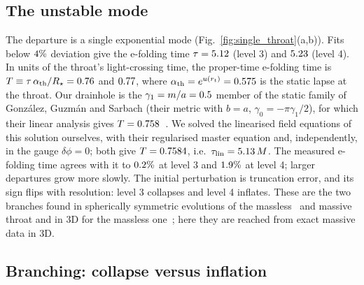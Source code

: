 \documentclass[twocolumn,floatfix,aps,prd,superscriptaddress,nofootinbib,showkeys]{revtex4-2}
\begin{document}
\subsection{The unstable mode}
\label{sec:single:instability}

The departure is a single exponential mode (Fig.~\ref{fig:single_throat}(a,b)). Fits below $4\%$ deviation give the e-folding time $\tau=5.12$ (level 3) and $5.23$ (level 4). In units of the throat's light-crossing time, the proper-time e-folding time is $T\equiv\tau\,\alpha_{\rm th}/R_\star=0.76$ and $0.77$, where $\alpha_{\rm th}=e^{u(r_t)}=0.575$ is the static lapse at the throat. Our drainhole is the $\gamma_1=m/a=0.5$ member of the static family of Gonz\'alez, Guzm\'an and Sarbach (their metric with $b=a$, $\gamma_0=-\pi\gamma_1/2$), for which their linear analysis gives $T=0.758$~\cite{gonzalez2009lin}. We solved the linearised field equations of this solution ourselves, with their regularised master equation and, independently, in the gauge $\delta\phi=0$; both give $T=0.7584$, i.e.\ $\tau_{\rm lin}=5.13\,M$. The measured e-folding time agrees with it to $0.2\%$ at level 3 and $1.9\%$ at level 4; larger departures grow more slowly. The initial perturbation is truncation error, and its sign flips with resolution: level 3 collapses and level 4 inflates. These are the two branches found in spherically symmetric evolutions of the massless~\cite{shinkai2002,calhoun2022} and massive~\cite{gonzalez2009,xu2025} throat and in 3D for the massless one~\cite{shirokov2026}; here they are reached from exact massive data in 3D.

\subsection{Branching: collapse versus inflation}
\label{sec:single:branching}
\end{document}
